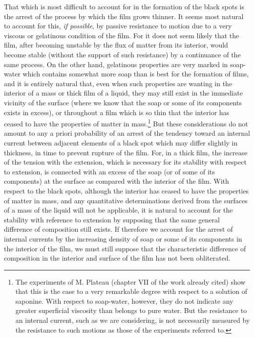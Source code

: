 \documentclass[12pt]{memoir}
\begin{document}
That which is most difficult to account for in the formation of the black spots is the arrest of the process by which the film grows thinner. It seems most natural to account for this, \textit{if possible}, by passive resistance to motion due to a very viscous or gelatinous condition of the film. For it does not seem likely that the film, after becoming unstable by the flux of matter from its interior, would become stable (without the support of such resistance) by a continuance of the same process. On the other hand, gelatinous properties are very marked in soap-water which contains somewhat more soap than is best for the formation of films, and it is entirely natural that, even when such properties are wanting in the interior of a mass or thick film of a liquid, they may still exist in the immediate vicinity of the surface (where we know that the soap or some of its components exists in excess), or throughout a film which is so thin that the interior has ceased to have the properties of matter in mass.\footnote{The experiments of M. Plateau (chapter VII of the work already cited) show that this is the case to a very remarkable degree with respect to a solution of saponine. With respect to soap-water, however, they do not indicate any greater superficial viscosity than belongs to pure water. But the resistance to an internal current, such as we are considering, is not necessarily measured by the resistance to such motions as those of the experiments referred to.} But these considerations do not amount to any a priori probability of an arrest of the tendency toward an internal current between adjacent elements of a black spot which may differ slightly in thickness, in time to prevent rupture of the film. For, in a thick film, the increase of the tension with the extension, which is necessary for its stability with respect to extension, is connected with an excess of the soap (or of some of its components) at the surface as compared with the interior of the film. With respect to the black spots, although the interior has ceased to have the properties of matter in mass, and any quantitative determinations derived from the surfaces of a mass of the liquid will not be applicable, it is natural to account for the stability with reference to extension by supposing that the same general difference of composition still exists. If therefore we account for the arrest of internal currents by the increasing density of soap or some of its components in the interior of the film, we must still suppose that the characteristic difference of composition in the interior and surface of the film has not been obliterated.
\end{document}
